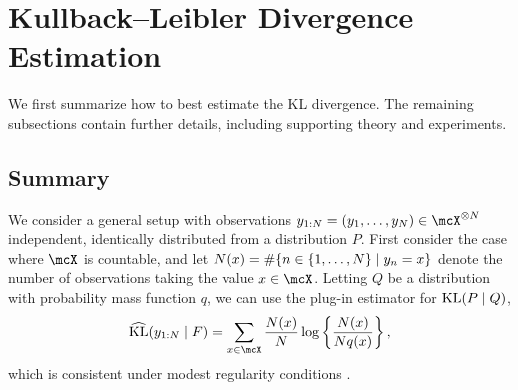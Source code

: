 



\section{Kullback--Leibler Divergence Estimation} \label{sec:kl-estimation}

We first summarize how to best estimate the KL divergence. 
The remaining subsections contain further details, including supporting theory
and experiments. 

\subsection{Summary}
We consider a general setup with observations $y_{1:\numobs} = (y_{1},\dots, y_{\numobs}) \in \mcX^{\otimes \numobs}$ independent, identically distributed
from a distribution $P$.
First consider the case where $\mcX$ is countable, and let $N(x) = \#\{ n \in \{1,\dots, N\} \mid y_{n} = x\}$ denote the number of observations
taking the value $x \in \mcX$.
Letting $Q$ be a distribution with probability mass function $q$, we can use the plug-in estimator for $\mathrm{KL}(P \mid Q)$,
\[
	\begin{aligned}
		\klest{y_{1:\numobs}}{F}
		= \sum_{x \in \mcX} \frac{\numobs(x)}{\numobs} \log \left\{\frac{\numobs(x)}{\numobs q(x)}\right\},
		\label{eq:plug-in-KL}
	\end{aligned}
\]
which is consistent under modest regularity conditions \citep{Paninski:2003}.

